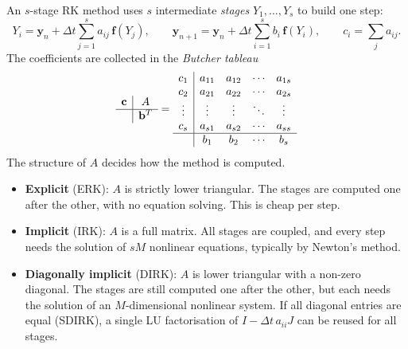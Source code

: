 \documentclass[11pt,a4paper]{article}
\newcommand{\Dt}{\Delta t}
\newcommand{\bfy}{\mathbf{y}}
\newcommand{\bff}{\mathbf{f}}
\begin{document}
An $s$-stage RK method uses $s$ intermediate \emph{stages} $Y_1,\dots,Y_s$ to build one step:
\begin{equation}
Y_i=\bfy_n+\Dt\sum_{j=1}^{s}a_{ij}\,\bff(Y_j),\qquad
\bfy_{n+1}=\bfy_n+\Dt\sum_{i=1}^{s}b_i\,\bff(Y_i),\qquad c_i=\sum_{j}a_{ij}.
\label{eq:rkgeneral}
\end{equation}
The coefficients are collected in the \emph{Butcher tableau}
\begin{equation}
\begin{array}{c|c}
\mathbf{c} & A\\ \hline
 & \mathbf{b}^{T}
\end{array}
=
\begin{array}{c|cccc}
c_1 & a_{11} & a_{12} & \cdots & a_{1s}\\
c_2 & a_{21} & a_{22} & \cdots & a_{2s}\\
\vdots & \vdots & \vdots & \ddots & \vdots\\
c_s & a_{s1} & a_{s2} & \cdots & a_{ss}\\ \hline
 & b_1 & b_2 & \cdots & b_s
\end{array}
\end{equation}
The structure of $A$ decides how the method is computed.
\begin{itemize}[leftmargin=*]
\item \textbf{Explicit} (ERK): $A$ is strictly lower triangular. The stages are computed one after the
other, with no equation solving. This is cheap per step.
\item \textbf{Implicit} (IRK): $A$ is a full matrix. All stages are coupled, and every step needs the
solution of $sM$ nonlinear equations, typically by Newton's method.
\item \textbf{Diagonally implicit} (DIRK): $A$ is lower triangular with a non-zero diagonal. The stages
are still computed one after the other, but each needs the solution of an $M$-dimensional nonlinear
system. If all diagonal entries are equal (SDIRK), a single LU factorisation of $I-\Dt\,a_{ii}J$ can be
reused for all stages.
\end{itemize}
\end{document}
